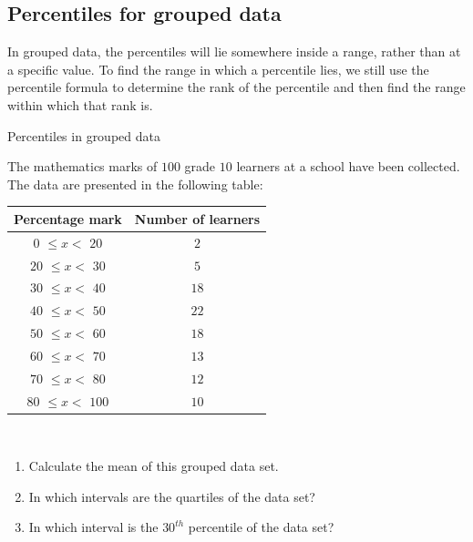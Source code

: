 \subsection{Percentiles for grouped data}

In grouped data, the percentiles will lie somewhere inside a range,
rather than at a specific value. To find the range in which a
percentile lies, we still use the percentile formula to determine the
rank of the percentile and then find the range within which that rank
is.

\begin{wex}{Percentiles in grouped data}{
    The mathematics marks of $100$ grade $10$ learners at a school have
    been collected. The data are presented in the following
    table:\\
    \begin{center}
      \begin{tabular}{|c|c|}  \hline
       
       \textbf{Percentage mark} & \textbf{Number of learners} \\  \hline

         $0$  $ \le x < $   $20$ &  $2$ \\ \hline
        $20$  $ \le x < $   $30$ &  $5$ \\\hline
        $30$  $ \le x < $   $40$ & $18$ \\\hline
        $40$  $ \le x < $   $50$ & $22$ \\\hline
        $50$  $ \le x < $   $60$ & $18$ \\\hline
        $60$  $ \le x < $   $70$ & $13$ \\\hline
        $70$  $ \le x < $   $80$ & $12$ \\\hline
        $80$  $ \le x < $  $100$ & $10$ \\\hline
   
      \end{tabular}
    \end{center}
\vspace {8pt}\\
    \begin{enumerate}[noitemsep, label=\textbf{\arabic*}.]
    \item Calculate the mean of this grouped data set.
    \item In which intervals are the quartiles of the data set?
    \item In which interval is the $30^{th}$ percentile of the data set?
    \end{enumerate}
}{

}
\end{wex}
